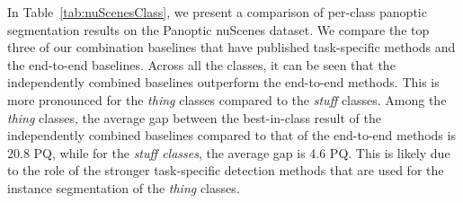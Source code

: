 \documentclass[letterpaper, 10 pt, journal, twoside]{IEEEtran}
\newcommand{\tableref}[1]{Table~\ref{#1}}
\begin{document}
In \tableref{tab:nuScenesClass}, we present a comparison of per-class panoptic segmentation results on the Panoptic nuScenes dataset. We compare the top three of our combination baselines that have published task-specific methods and the end-to-end baselines. Across all the classes, it can be seen that the independently combined baselines outperform the end-to-end methods. This is more pronounced for the \emph{thing} classes compared to the \emph{stuff} classes. Among the \emph{thing} classes, the average gap between the best-in-class result of the independently combined baselines compared to that of the end-to-end methods is 20.8 PQ, while for the \emph{stuff classes}, the average gap is 4.6 PQ. This is likely due to the role of the stronger task-specific detection methods that are used for the instance segmentation of the \emph{thing} classes.
\end{document}
